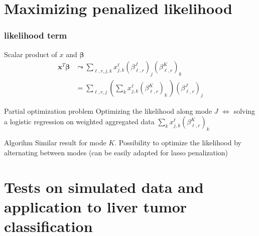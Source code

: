 \documentclass{beamer}
\begin{document}
\section{Maximizing penalized likelihood}
\begin{frame}
\sectionpage
\end{frame}

\begin{frame}
\frametitle{likelihood term}
\begin{block}{Scalar product of $x$ and $\bm{\beta}$}
\begin{align*}
\mathbf{x}^T\bm{\beta} &\leadsto \sum\limits_{\ell,r,j,k} x_{j,k}^\ell(\beta_{\ell,r}^J)_j(\beta_{\ell,r}^K)_k\\[-5 pt]
&= \sum\limits_{\ell,r,j} \left(\sum\limits_{k}  x_{j,k}^\ell(\beta_{\ell,r}^{K})_k \, \right)(\beta_{\ell,r}^{J})_j
\end{align*}
\end{block}

\begin{block}{Partial optimization problem}
 Optimizing the likelihood along mode $J$ $\Leftrightarrow$ solving a logistic regression on weighted aggregated data $\sum\limits_{k}  x_{j,k}^\ell(\beta_{\ell,r}^{K})_k $
\end{block}
\begin{block}{Algorihm}
Similar result for mode $K$. Possibility to optimize the likelihood by alternating between modes (can be easily adapted for lasso penalization)
\end{block}

\end{frame}




\section{Tests on simulated data and application to liver tumor classification}  
\begin{frame}
  \sectionpage
\end{frame}
\end{document}
